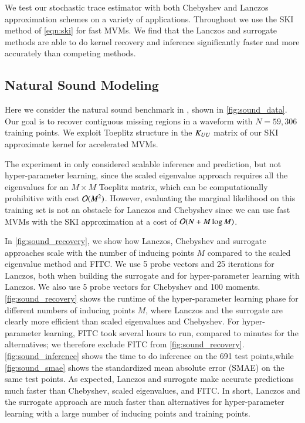 We test our stochastic trace estimator with both Chebyshev and Lanczos
approximation schemes on a variety of applications. Throughout we use the SKI
method \citep{wilson2015kernel} of \cref{eqn:ski} for fast MVMs. We find that
the Lanczos and surrogate methods are able to do kernel recovery and inference
significantly faster and more accurately than competing methods.

\subsection{Natural Sound Modeling}\label{sgpsec:sound}

Here we consider the natural sound benchmark in \cite{wilson2015kernel}, shown
in \cref{fig:sound_data}. Our goal is to recover contiguous missing
regions in a waveform with $N = 59,306$ training points. We exploit Toeplitz
structure in the $K_{UU}$ matrix of our SKI approximate kernel for accelerated
MVMs.

The experiment in \cite{wilson2015kernel} only considered scalable inference and
prediction, but not hyper\hyp{}parameter learning, since the scaled eigenvalue
approach requires all the eigenvalues for an $M \times M$ Toeplitz matrix, which
can be computationally prohibitive with cost $\mathcal{O}(M^2)$. However, evaluating
the marginal likelihood on this training set is not an obstacle for Lanczos and
Chebyshev since we can use fast MVMs with the SKI approximation at a cost of
$\mathcal{O}(N + M \log M)$.

In \cref{fig:sound_recovery}, we show how Lanczos, Chebyshev and surrogate
approaches scale with the number of inducing points $M$ compared to the scaled
eigenvalue method and FITC.  We use 5 probe vectors and 25 iterations for
Lanczos, both when building the surrogate and for hyper\hyp{}parameter learning
with Lanczos. We also use 5 probe vectors for Chebyshev and 100 moments. 
\cref{fig:sound_recovery} shows the runtime of the hyper\hyp{}parameter learning
phase for different numbers of inducing points $M$, where Lanczos and the
surrogate are clearly more efficient than scaled eigenvalues and Chebyshev. For
hyper\hyp{}parameter learning, FITC took several hours to run, compared to
minutes for the alternatives; we therefore exclude FITC from 
\cref{fig:sound_recovery}. \cref{fig:sound_inference} shows the time to do
inference on the 691 test points,while \ref{fig:sound_smae} shows the
standardized mean absolute error (SMAE) on the same test points. As expected,
Lanczos and surrogate make accurate predictions much faster than Chebyshev,
scaled eigenvalues, and FITC. In short, Lanczos and the surrogate approach are
much faster than alternatives for hyper\hyp{}parameter learning with a large
number of inducing points and training points.

